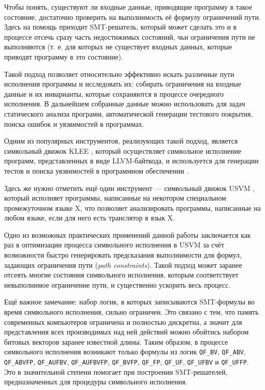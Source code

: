 Чтобы понять, существуют ли входные данные, приводящие программу в такое состояние, достаточно проверить на выполнимость её формулу ограничений пути. Здесь на помощь приходит SMT-решатель, который может сделать это и в процессе отсечь сразу часть недостижимых состояний, чьи ограничения пути не выполняются (т. е. для которых не существует входных данных, которые приводят программу в это состояние).

Такой подход позволяет относительно эффективно искать различные пути исполнения программы и исследовать их: собирать ограничения на входные данные и их инварианты, которые сохраняются в процессе очередного исполнения. В дальнейшем собранные данные можно использовать для задач статического анализа программ, автоматической генерации тестового покрытия, поиска ошибок и уязвимостей в программах.

Одним из популярных инструментов, реализующих такой подход, является символьный движок KLEE \cite{klee-website}, который осуществляет символьное исполнение программ, представленных в виде LLVM-байткода, и используется для генерации тестов и поиска уязвимостей в программном обеспечении \cite{klee-paper}.

Здесь же нужно отметить ещё один инструмент --- символьный движок USVM \cite{usvm-diploma}, который исполняет программы, написанные на некотором специальном промежуточном языке X, что позволяет анализировать программы, написанные на любом языке, если для него есть транслятор в язык X.

Одно из возможных практических применений данной работы заключается как раз в оптимизации процесса символьного исполнения в USVM за счёт возможности быстро генерировать предсказания выполнимости для формул, задающих ограничения пути (\textit{path constraints}). Такой подход может заранее отсеять многие состояния символьного исполнения, которым соответствует невыполнимое ограничение пути, и существенно ускорить весь процесс.

Ещё важное замечание: набор логик, в которых записываются SMT-формулы во время символьного исполнения, сильно ограничен. Это связано с тем, что память современных компьютеров ограничена и полностью дискретна, а значит для представления всех производимых над ней действий можно обойтись набором битовых векторов заранее известной длины. Таким образом, в процессе символьного исполнения возникают только формулы из логик \texttt{QF\_BV}, \texttt{QF\_ABV}, \texttt{QF\_ABVFP}, \texttt{QF\_AUFBV}, \texttt{QF\_AUFBVFP}, \texttt{QF\_BVFP}, \texttt{QF\_FP}, \texttt{QF\_UF}, \texttt{QF\_UFBV} и \texttt{QF\_UFFP}. Это в значительной степени помогает при построении SMT-решателей, предназначенных для процедуры символьного исполнения.
